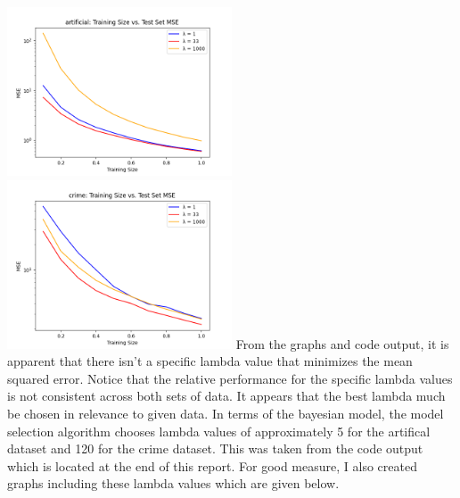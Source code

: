 \documentclass{article}
\begin{document}
\includegraphics[width=0.5\textwidth]{../output/task1iiiartificial.png}
\includegraphics[width=0.5\textwidth]{../output/task1iiicrime.png}
From the graphs and code output, it is apparent that there isn't a specific lambda value that minimizes the mean squared error. Notice that the relative performance for the specific lambda values is not consistent across both sets of data. It appears that the best lambda much be chosen in relevance to given data. In terms of the bayesian model, the model selection algorithm chooses lambda values of approximately 5 for the artifical dataset and 120 for the crime dataset. This was taken from the code output which is located at the end of this report. For good measure, I also created graphs including these lambda values which are given below.
\end{document}
